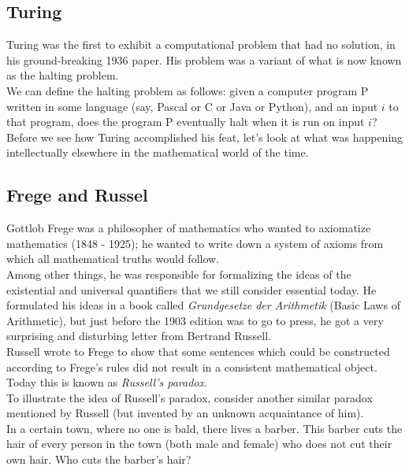 \documentclass[12pt]{article}
\theoremstyle{plain}
\theoremstyle{definition}
\begin{document}
\subsection{Turing}
Turing was the first to exhibit a computational problem that had no solution, in his ground-breaking 1936 paper.
His problem was a variant of what is now known as the halting problem. \\

We can define the halting problem as follows: given a computer program P written in some language (say, Pascal or C or Java or Python), and an input $i$ to that program, does the program P eventually halt when it is run on input $i$? \\

Before we see how Turing accomplished his feat, let's look at what was happening intellectually elsewhere in the mathematical world of the time.

\subsection{Frege and Russel}
Gottlob Frege was a philosopher of mathematics who wanted to axiomatize mathematics (1848 - 1925);
he wanted to write down a system of axioms from which all mathematical truths would follow. \\
Among other things, he was responsible for formalizing the ideas of the existential and universal quantifiers that we still consider essential today.
He formulated his ideas in a book called \emph{Grundgesetze der Arithmetik} (Basic Laws of Arithmetic), but just before the 1903 edition was to go to press, he got a very surprising and disturbing letter from Bertrand Russell. \\

Russell wrote to Frege to show that some sentences which could be constructed according to Frege's rules did not result in a consistent mathematical object.
Today this is known as \emph{Russell's paradox}. \\

To illustrate the idea of Russell's paradox, consider another similar paradox mentioned by Russell (but invented by an unknown acquaintance of him). \\
In a certain town, where no one is bald, there lives a barber.
This barber cuts the hair of every person in the town (both male and female) who does not cut their own hair.
Who cuts the barber's hair? \\
\end{document}
